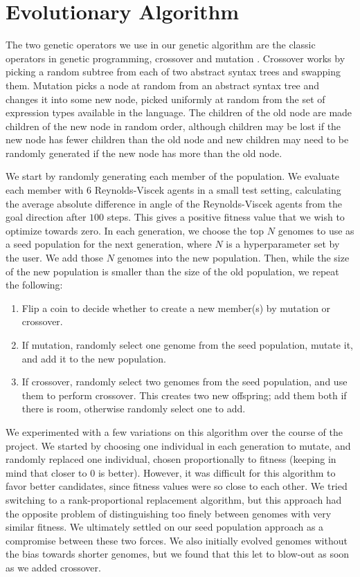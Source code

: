 \section{Evolutionary Algorithm}
\label{sec:evolutionaryalg}
The two genetic operators we use in our genetic algorithm are the classic
operators in genetic programming, crossover and mutation \cite{deCastro2007}.
Crossover works by picking a random subtree from each of two abstract syntax
trees and swapping them.
Mutation picks a node at random from an abstract syntax tree and changes it
into some new node, picked uniformly at random from the set of expression types
available in the language.
The children of the old node are made children of the new node in random order,
although children may be lost if the new node has fewer children than the old
node and new children may need to be randomly generated if the new node has
more than the old node.

We start by randomly generating each member of the population.
We evaluate each member with $6$ Reynolds-Viscek agents in a small test setting,
calculating the average absolute difference in angle of the Reynolds-Viscek
agents from the goal direction after $100$ steps.
This gives a positive fitness value that we wish to optimize towards zero.
In each generation, we choose the top $N$ genomes to use as a seed population
for the next generation, where $N$ is a hyperparameter set by the user.
We add those $N$ genomes into the new population.
Then, while the size of the new population is smaller than the size of the
old population, we repeat the following:
\begin{enumerate}
    \item Flip a coin to decide whether to create a new member(s) by mutation
    or crossover.
    \item If mutation, randomly select one genome from the seed population,
    mutate it, and add it to the new population.
    \item If crossover, randomly select two genomes from the seed population,
    and use them to perform crossover.
    This creates two new offspring; add them both if there is room, otherwise
    randomly select one to add.
\end{enumerate}

We experimented with a few variations on this algorithm over the course of the
project.
We started by choosing one individual in each generation to mutate, and randomly
replaced one individual, chosen proportionally to fitness (keeping in mind that
closer to $0$ is better).
However, it was difficult for this algorithm to favor better candidates, since
fitness values were so close to each other.
We tried switching to a rank-proportional replacement algorithm, but this
approach had the opposite problem of distinguishing too finely between genomes
with very similar fitness.
We ultimately settled on our seed population approach as a compromise between
these two forces.
We also initially evolved genomes without the bias towards shorter genomes,
but we found that this let to blow-out as soon as we added crossover.
